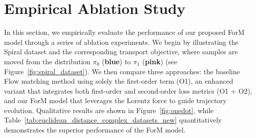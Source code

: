 \section{Empirical Ablation Study} \label{sec:ablation}

In this section, we empirically evaluate the performance of our proposed ForM model through a series of ablation experiments. We begin by illustrating the Spiral dataset and the corresponding transport objective, where samples are moved from the distribution $\pi_0$ ({\textbf{blue}}) to $\pi_1$ ({\textbf{pink}}) (see Figure~\ref{fig:spiral_dataset}). We then compare three approaches: the baseline Flow matching method using solely the first-order term (O1), an enhanced variant that integrates both first-order and second-order loss metrics (O1 + O2), and our ForM model that leverages the Lorentz force to guide trajectory evolution. Qualitative results are shown in Figure~\ref{fig:onedot}, while Table~\ref{tab:euclidean_distance_complex_datasets_new} quantitatively demonstrates the superior performance of the ForM model.
